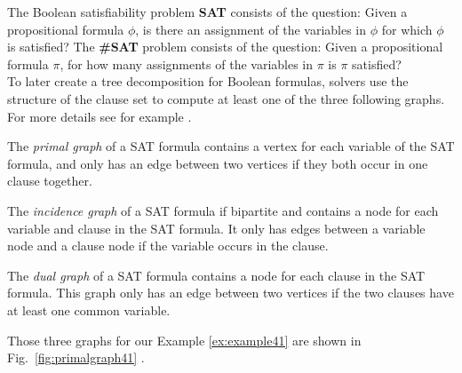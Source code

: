 \documentclass[a4paper, 12pt, bibliography=totoc]{scrartcl}
\begin{document}
The Boolean satisfiability problem \textbf{SAT} consists of the question: Given a propositional formula $\phi$, is there an assignment of the variables in $\phi$ for which $\phi$ is satisfied?
The \textbf{\#SAT} problem consists of the question: Given a propositional formula $\pi$, for how many assignments of the variables in $\pi$ is $\pi$ satisfied?\\


To later create a tree decomposition for Boolean formulas, solvers use the structure of the clause set to compute at least one of the three following graphs.
For more details see for example \cite[Chapter~2.1]{DiplomarbeitZisser}.

The \textit{primal graph} of a SAT formula contains a vertex for each variable of the SAT formula, and only has an edge between two vertices if they both occur in one clause together.

The \textit{incidence graph} of a SAT formula if bipartite and contains a node for each variable and clause in the SAT formula. It only has edges between a variable node and a clause node if the variable occurs in the clause.

The \textit{dual graph} of a SAT formula contains a node for each clause in the SAT formula. This graph only has an edge between two vertices if the two clauses have at least one common variable.

Those three graphs for our Example \ref{ex:example41} are shown in Fig.~\ref{fig:primalgraph41} .
\end{document}
